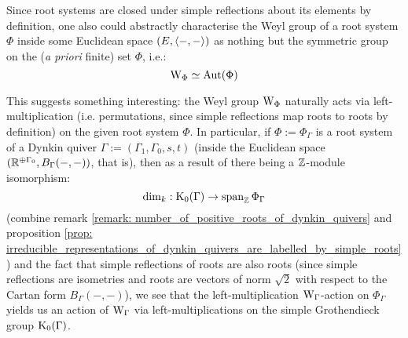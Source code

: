             \begin{remark} \label{remark: actions_of_weyl_groups_on_grothendieck_groups_of_dynkin_quivers}
                Since root systems are closed under simple reflections about its elements by definition, one also could abstractly characterise the Weyl group of a root system $\Phi$ inside some Euclidean space $(E, \langle-, -\rangle)$ as nothing but the symmetric group on the (\textit{a priori} finite) set $\Phi$, i.e.:
                    $$\mathrm{W}_{\Phi} \simeq \mathrm{Aut}(\Phi)$$
                    
                This suggests something interesting: the Weyl group $\mathrm{W}_{\Phi}$ naturally acts via left-multiplication (i.e. permutations, since simple reflections map roots to roots by definition) on the given root system $\Phi$. In particular, if $\Phi := \Phi_{\Gamma}$ is a root system of a Dynkin quiver $\Gamma := (\Gamma_1, \Gamma_0, s, t)$ (inside the Euclidean space $(\mathbb{R}^{\oplus \Gamma_0}, B_{\Gamma}(-, -))$, that is), then as a result of there being a $\mathbb{Z}$-module isomorphism:
                    $$\dim_k: \mathrm{K}_0(\Gamma) \to \operatorname{span}_{\mathbb{Z}} \Phi_{\Gamma}$$
                (combine remark \ref{remark: number_of_positive_roots_of_dynkin_quivers} and proposition \ref{prop: irreducible_representations_of_dynkin_quivers_are_labelled_by_simple_roots}) and the fact that simple reflections of roots are also roots (since simple reflections are isometries and roots are vectors of norm $\sqrt{2}$ with respect to the Cartan form $B_{\Gamma}(-, -)$), we see that the left-multiplication $\mathrm{W}_{\Gamma}$-action on $\Phi_{\Gamma}$ yields us an action of $\mathrm{W}_{\Gamma}$ via left-multiplications on the simple Grothendieck group $\mathrm{K}_0(\Gamma)$.
                

\end{remark}
